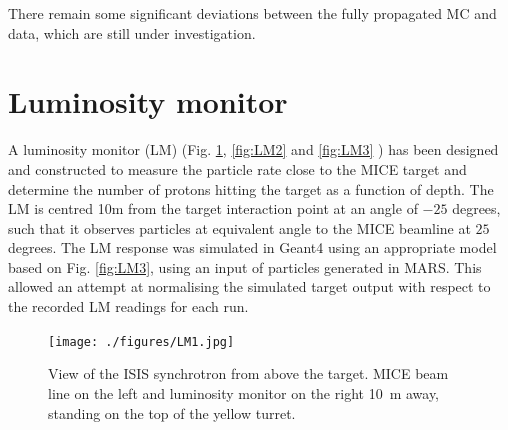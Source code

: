 \documentclass[a4paper,11pt]{article}
\begin{document}
There remain some significant deviations between the fully propagated MC and data, which are still under investigation. %

\section{Luminosity monitor}

A luminosity monitor (LM) (Fig. \ref{fig:LM1}, \ref{fig:LM2} and \ref{fig:LM3} ) has been designed and constructed to measure the particle rate close to the MICE target and determine the number of protons hitting the target as a function of depth. The LM is centred 10m from the target interaction point at an angle of $-25$ degrees, such that it observes particles at equivalent angle to the MICE beamline at $25$ degrees. 
The LM response was simulated in Geant4 using an appropriate model based on Fig. \ref{fig:LM3}, using an input of particles generated in MARS. This allowed an attempt at normalising the simulated target output with respect to the recorded LM readings for each run.


\begin{figure}
  \begin{center}
    \texttt{[image: ./figures/LM1.jpg]}
    \caption{View of the ISIS synchrotron from above the target. MICE beam line on the left and luminosity monitor on the right 10~m away, standing on the top of the yellow turret.}
    \label{fig:LM1}
  \end{center}
\end{figure}
\end{document}
